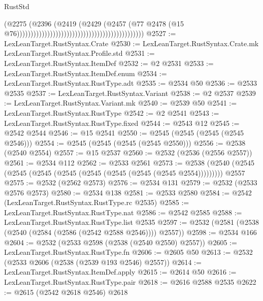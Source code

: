 \begin{lexlean}{RustStd}
\begin{coremodule}
                                                                                  (@2275
                                                                                    (@2396
                                                                                      (@2419
                                                                                        (@2429
                                                                                          (@2457
                                                                                            (@77
                                                                                              @2478
                                                                                              (@15
                                                                                                @76))))))))))))))))))))))))))))))))))))))))))))))
@2527 := LexLeanTarget.RustSyntax.Crate
@2530 := LexLeanTarget.RustSyntax.Crate.mk LexLeanTarget.RustSyntax.Profile.std
@2531 := LexLeanTarget.RustSyntax.ItemDef
@2532 := @2 @2531
@2533 := LexLeanTarget.RustSyntax.ItemDef.enum
@2534 := LexLeanTarget.RustSyntax.RustType.adt
@2535 := @2534 @50
@2536 := @2533 @2535
@2537 := LexLeanTarget.RustSyntax.Variant
@2538 := @2 @2537
@2539 := LexLeanTarget.RustSyntax.Variant.mk
@2540 := @2539 @50
@2541 := LexLeanTarget.RustSyntax.RustType
@2542 := @2 @2541
@2543 := LexLeanTarget.RustSyntax.RustType.fixed
@2544 := @2543 @12
@2545 := @2542 @2544
@2546 := @15 @2541
@2550 := @2545 (@2545 (@2545 (@2545 @2546)))
@2554 := @2545 (@2545 (@2545 (@2545 @2550)))
@2556 := @2538 (@2540 @2554)
@2557 := @15 @2537
@2560 := @2532 (@2536 (@2556 @2557))
@2561 := @2534 @112
@2562 := @2533 @2561
@2573 := @2538 (@2540 (@2545 (@2545 (@2545 (@2545 (@2545 (@2545 (@2545 (@2545 @2554))))))))) @2557
@2575 := @2532 (@2562 @2573)
@2576 := @2534 @131
@2579 := @2532 (@2533 @2576 @2573)
@2580 := @2534 @138
@2581 := @2533 @2580
@2584 := @2542 (LexLeanTarget.RustSyntax.RustType.rc @2535)
@2585 := LexLeanTarget.RustSyntax.RustType.nat
@2586 := @2542 @2585
@2588 := LexLeanTarget.RustSyntax.RustType.list @2535
@2597 := @2532 (@2581 (@2538 (@2540 (@2584 (@2586 (@2542 @2588 @2546)))) @2557))
@2598 := @2534 @166
@2604 := @2532 (@2533 @2598 (@2538 (@2540 @2550) @2557))
@2605 := LexLeanTarget.RustSyntax.RustType.fn
@2606 := @2605 @50
@2613 := @2532 (@2533 @2606 (@2538 (@2539 @193 @2546) @2557))
@2614 := LexLeanTarget.RustSyntax.ItemDef.apply
@2615 := @2614 @50
@2616 := LexLeanTarget.RustSyntax.RustType.pair
@2618 := @2616 @2588 @2535
@2622 := @2615 (@2542 @2618 @2546) @2618

\end{coremodule}
\end{lexlean}
